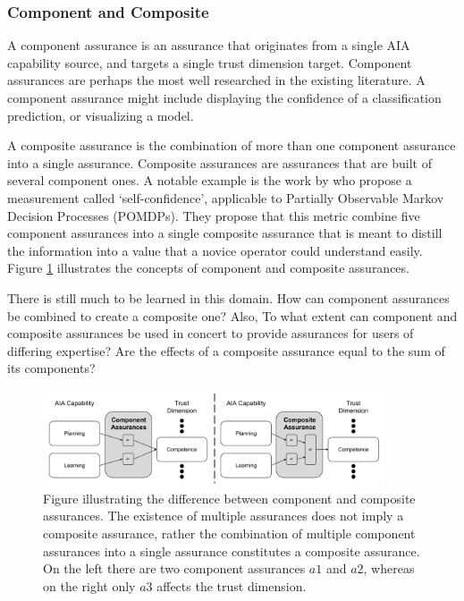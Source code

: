 \subsubsection{Component and Composite}
A component assurance is an assurance that originates from a single AIA capability source, and targets a single trust dimension target. Component assurances are perhaps the most well researched in the existing literature. A component assurance might include displaying the confidence of a classification prediction, or visualizing a model.

A composite assurance is the combination of more than one component assurance into a single assurance. Composite assurances are assurances that are built of several component ones. A notable example is the work by \citet{Aitken2016-cv} who propose a measurement called `self-confidence', applicable to Partially Observable Markov Decision Processes (POMDPs). They propose that this metric combine five component assurances into a single composite assurance that is meant to distill the information into a value that a novice operator could understand easily. Figure \ref{fig:assurance_mapping} illustrates the concepts of component and composite assurances. 

There is still much to be learned in this domain. How can component assurances be combined to create a composite one? Also, To what extent can component and composite assurances be used in concert to provide assurances for users of differing expertise? Are the effects of a composite assurance equal to the sum of its components?

\begin{figure}[!htbp]
    \centering
    \includegraphics[width=0.9\textwidth]{Figures/Assurance_component_composite.pdf}
    \caption{Figure illustrating the difference between component and composite assurances. The existence of multiple assurances does not imply a composite assurance, rather the combination of multiple component assurances into a single assurance constitutes a composite assurance. On the left there are two component assurances $a1$ and $a2$, whereas on the right only $a3$ affects the trust dimension.}
    \label{fig:assurance_mapping}
\end{figure}
